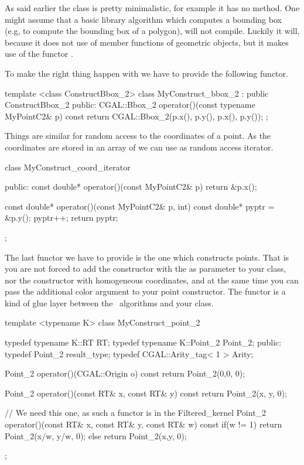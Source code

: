 As said earlier the class is pretty minimalistic, for
example it has no  method.  One
might assume that a basic library algorithm which computes 
a bounding box (e.g, to compute the bounding box of a polygon),
will not compile. Luckily it will, because it does not
use of member functions of geometric objects, but it makes
use of the functor .

To make the right thing happen with  we
have to provide the following functor.

\ccHtmlLinksOff
\begin{ccExampleCode}
template <class ConstructBbox_2>
class MyConstruct_bbox_2 : public ConstructBbox_2 {
public:
  CGAL::Bbox_2 operator()(const typename MyPointC2& p) const {
    return CGAL::Bbox_2(p.x(), p.y(), p.x(), p.y());
  }
};
\end{ccExampleCode}
\ccHtmlLinksOn


Things are similar for random access to the 
coordinates of a point. As the coordinates are stored
in an array of  we can use  as
random access iterator.

\ccHtmlLinksOff
\begin{ccExampleCode}
class MyConstruct_coord_iterator {
public:
  const double* operator()(const MyPointC2& p)
  {
    return &p.x();
  }

  const double* operator()(const MyPointC2& p, int)
  {
    const double* pyptr = &p.y();
    pyptr++;
    return pyptr;
  }
};
\end{ccExampleCode}
\ccHtmlLinksOn

The last functor we have to provide is the one which constructs
points. That is you are not forced to add the constructor 
with the  as parameter to your class, nor the constructor with 
homogeneous coordinates, and at the same time you can 
pass the additional color argument to your point constructor.
The functor is a kind of glue layer between the \cgal\ algorithms
and your class.

\ccHtmlLinksOff
\begin{ccExampleCode}
 template <typename K>
  class MyConstruct_point_2
  {
    typedef typename K::RT         RT;
    typedef typename K::Point_2    Point_2;
  public:
    typedef Point_2          result_type;
    typedef CGAL::Arity_tag< 1 >   Arity;

    Point_2
    operator()(CGAL::Origin o) const
    { return Point_2(0,0, 0); }

    Point_2
    operator()(const RT& x, const RT& y) const
    { return Point_2(x, y, 0); }

    
    // We need this one, as such a functor is in the Filtered_kernel
    Point_2
    operator()(const RT& x, const RT& y, const RT& w) const
    { 
      if(w != 1){
	return Point_2(x/w, y/w, 0); 
      } else {
	return Point_2(x,y, 0);
      }
    }
  };

\end{ccExampleCode}
\ccHtmlLinksOn


